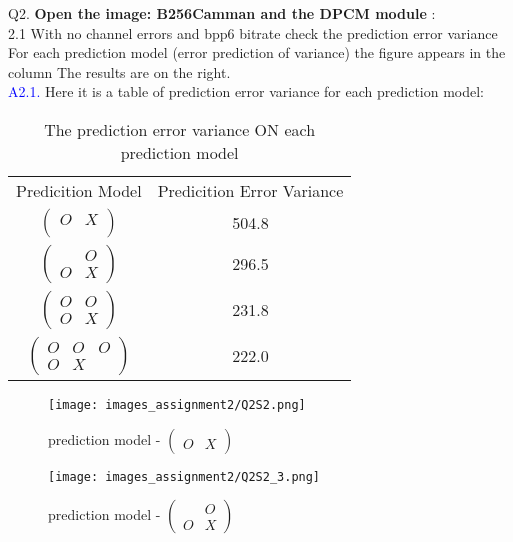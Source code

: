 \documentclass[letterpaper, 12pt]{article}
\begin{document}
Q2. \textbf{Open the image: B256Camman and the DPCM module} :\\
2.1 With no channel errors and bpp6 bitrate check the prediction error variance
For each prediction model (error prediction of variance) the figure appears in the column
The results are on the right. \\
\textcolor{blue}{A2.1.} Here it is a table of prediction error variance for each prediction model:

\begin{table}[htbp]
    \centering
    \begin{tabular}{cc}
         Predicition Model& Predicition Error Variance\\
 $\begin{pmatrix}O & X \\ \end{pmatrix}$ & 504.8\\
 
 $\begin{pmatrix}& O\\ O & X\end{pmatrix}$ & 296.5 \\ 
 
 $\begin{pmatrix}O & O\\ O & X \end{pmatrix}$ & 231.8\\
 
 $\begin{pmatrix} O & O & O\\ O & X \end{pmatrix}$ & 222.0 \\ 
 
    \end{tabular}
    \caption{The prediction error variance ON each prediction model}
    \label{tab:my_label}
\end{table}

\begin{figure}[htbp]
    \centering
    \texttt{[image: images\_assignment2/Q2S2.png]}
    \caption{prediction model - $\begin{pmatrix}
 & \\
O & X
\end{pmatrix}$}
\end{figure}

\begin{figure}[htbp]
    \centering
    \texttt{[image: images\_assignment2/Q2S2\_3.png]}
    \caption{prediction model - $\begin{pmatrix}
 & O\\
O & X
\end{pmatrix}$}
\end{figure}
\end{document}
